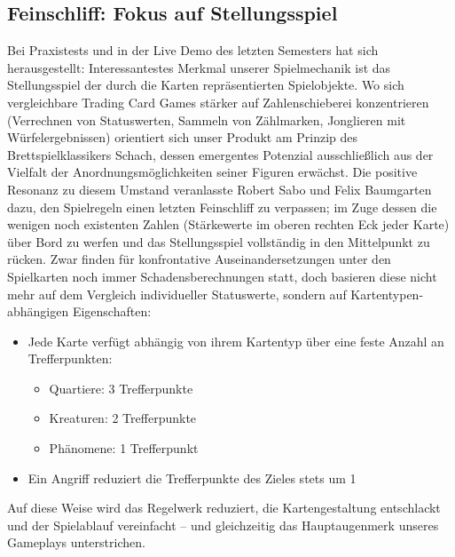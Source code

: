\subsection{Feinschliff: Fokus auf Stellungsspiel}
Bei Praxistests und in der Live Demo des letzten Semesters hat sich herausgestellt: Interessantestes Merkmal unserer Spielmechanik ist das Stellungsspiel der durch die Karten repräsentierten Spielobjekte.
Wo sich vergleichbare Trading Card Games stärker auf Zahlenschieberei konzentrieren (Verrechnen von Statuswerten, Sammeln von Zählmarken, Jonglieren mit Würfelergebnissen) orientiert sich unser Produkt am Prinzip des Brettspielklassikers Schach, dessen emergentes Potenzial ausschließlich aus der Vielfalt der Anordnungsmöglichkeiten seiner Figuren erwächst.
Die positive Resonanz zu diesem Umstand veranlasste Robert Sabo und Felix Baumgarten dazu, den Spielregeln einen letzten Feinschliff zu verpassen; im Zuge dessen die wenigen noch existenten Zahlen (Stärkewerte im oberen rechten Eck jeder Karte) über Bord zu werfen und das Stellungsspiel vollständig in den Mittelpunkt zu rücken. Zwar finden für konfrontative Auseinandersetzungen unter den Spielkarten noch immer Schadensberechnungen statt, doch basieren diese nicht mehr auf dem Vergleich individueller Statuswerte, sondern auf Kartentypen-abhängigen Eigenschaften:
\begin{itemize}
\item Jede Karte verfügt abhängig von ihrem Kartentyp über eine feste Anzahl an Trefferpunkten:
\begin{itemize}
\item Quartiere: 3 Trefferpunkte
\item Kreaturen: 2 Trefferpunkte
\item Phänomene: 1 Trefferpunkt
\end{itemize}
\item Ein Angriff reduziert die Trefferpunkte des Zieles stets um 1
\end{itemize}
Auf diese Weise wird das Regelwerk reduziert, die Kartengestaltung entschlackt und der Spielablauf vereinfacht – und gleichzeitig das Hauptaugenmerk unseres Gameplays unterstrichen.
